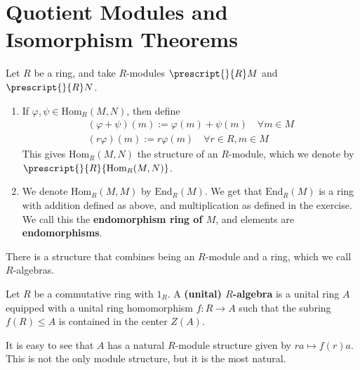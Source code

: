 \documentclass{memoir}
\begin{document}


\section{Quotient Modules and Isomorphism Theorems}
\label{sec:quotient_modules_and_isomorphism_theorems}

\begin{prop}
	Let \(R\) be a ring, and take \(R\)-modules \(\prescript{}{R}M\) and \(\prescript{}{R}N\).
	\begin{enumerate}
		\item If \(\varphi,\psi \in \textrm{Hom}_R(M,N)\), then define
			\begin{align*}
				(\varphi+\psi)(m) := \varphi(m) + \psi(m) \quad \forall m \in M\\
				(r \varphi) (m) := r \varphi(m) \quad \forall r \in R, m \in M
			\end{align*}
		This gives \( \textrm{Hom}_R(M,N)\) the structure of an \(R\)-module, which we denote by \(\prescript{}{R}{\textrm{Hom}_R(M,N)}\).
		\item We denote \( \textrm{Hom}_R(M,M)\) by \( \textrm{End}_R(M)\). We get that \( \textrm{End}_R(M)\) is a ring with addition defined as above, and multiplication as defined in the exercise. We call this the \textbf{endomorphism ring of \(M\)}, and elements are \textbf{endomorphisms}.
	\end{enumerate}
\end{prop}
There is a structure that combines being an \(R\)-module and a ring, which we call \(R\)-algebras.

\begin{defn}[\(R\)-algebra]
	Let \(R\) be a commutative ring with \(1_R\). A \textbf{(unital) \(R\)-algebra} is a unital ring \(A\) equipped with a unital ring homomorphism \(f:R\to A\) such that the subring \(f(R)\leq A\) is contained in the center \(Z(A)\). 
\end{defn}
It is easy to see that \(A\) has a natural \(R\)-module structure given by \(ra \mapsto f(r)a\). This is not the only module structure, but it is the most natural.\\
\end{document}
